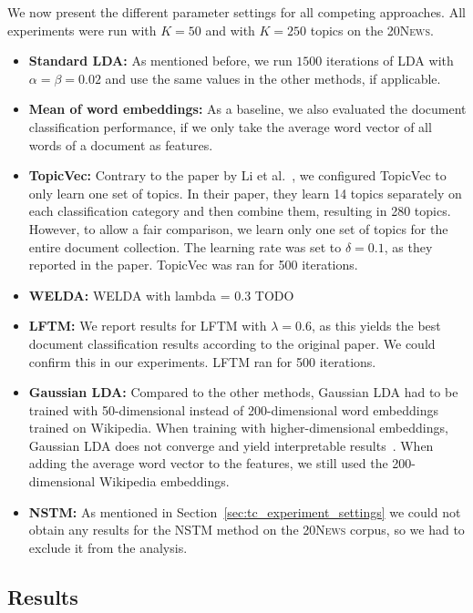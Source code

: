 \documentclass[
        a4paper,
        titlepage,
        twoside,
        parskip,
        numbers=noenddot
        ]{scrbook}
\theoremstyle{break}
\begin{document}
We now present the different parameter settings for all competing approaches.
All experiments were run with $K = 50$ and with $K = 250$ topics on the \textsc{20News}.

\begin{itemize}
  \item
    \textbf{Standard LDA:}
    As mentioned before, we run $1500$ iterations of LDA with $\alpha = \beta = 0.02$ and use the same values in the other methods, if applicable.
  \item
    \textbf{Mean of word embeddings:}
    As a baseline, we also evaluated the document classification performance, if we only take the average word vector of all words of a document as features.
  \item
    \textbf{TopicVec:}
    Contrary to the paper by Li et al.~\cite{Li2016}, we configured TopicVec to only learn one set of topics.
    In their paper, they learn 14 topics separately on each classification category and then combine them, resulting in 280 topics.
    However, to allow a fair comparison, we learn only one set of topics for the entire document collection.
    The learning rate was set to $\delta = 0.1$, as they reported in the paper.
    TopicVec was ran for 500 iterations.
  \item
    \textbf{WELDA:}
    WELDA with lambda = 0.3 TODO
  \item
    \textbf{LFTM:}
    We report results for LFTM with $\lambda = 0.6$, as this yields the best document classification results according to the original paper.
    We could confirm this in our experiments.
    LFTM ran for 500 iterations.
  \item
    \textbf{Gaussian LDA:}
    Compared to the other methods, Gaussian LDA had to be trained with 50-dimensional instead of 200-dimensional word embeddings trained on Wikipedia.
    When training with higher-dimensional embeddings, Gaussian LDA does not converge and yield interpretable results~\cite{Das2016}.
    When adding the average word vector to the features, we still used the 200-dimensional Wikipedia embeddings.
  \item
    \textbf{NSTM:}
    As mentioned in Section~\ref{sec:tc_experiment_settings} we could not obtain any results for the NSTM method on the \textsc{20News} corpus, so we had to exclude it from the analysis.
\end{itemize}

\subsection{Results}
\end{document}
